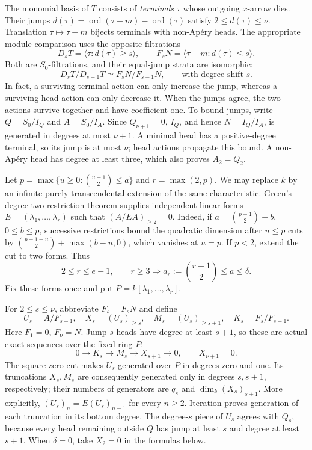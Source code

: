 The monomial basis of $T$ consists of \emph{terminals} $\tau$ whose
outgoing $x$-arrow dies.  Their jumps
$d(\tau)=\operatorname{ord}(\tau+m)-\operatorname{ord}(\tau)$ satisfy
$2\le d(\tau)\le\nu$.  Translation $\tau\mapsto\tau+m$ bijects terminals
with non-Ap\'ery heads.  The appropriate module comparison uses the
opposite filtrations
\[
 D_sT=\langle\tau:d(\tau)\ge s\rangle,\qquad
 F_sN=\langle\tau+m:d(\tau)\le s\rangle.
\]
Both are $S_0$-filtrations, and their equal-jump strata are isomorphic:
\begin{equation}\label{eq:ordinary-strata}
 D_sT/D_{s+1}T\simeq F_sN/F_{s-1}N,
 \qquad\text{with degree shift }s.
\end{equation}
In fact, a surviving terminal action can only increase the jump, whereas
a surviving head action can only decrease it.  When the jumps agree, the
two actions survive together and have coefficient one.  To bound jumps,
write $Q=S_0/I_Q$ and $A=S_0/I_A$.  Since $Q_{\nu+1}=0$, $I_Q$, and hence
$N=I_Q/I_A$, is generated in degrees at most $\nu+1$.  A minimal head has
a positive-degree terminal, so its jump is at most $\nu$; head actions
propagate this bound.  A non-Ap\'ery head has degree at least three, which
also proves $A_2=Q_2$.

Let $p=\max\{u\ge0:\binom{u+1}{2}\le a\}$ and $r=\max(2,p)$.
We may replace $k$ by an infinite purely transcendental extension of the
same characteristic.  Green's degree-two restriction theorem
\cite{GreenRestriction} supplies independent linear forms
$E=(\lambda_1,\ldots,\lambda_r)$ such that $(A/EA)_{\ge2}=0$.
Indeed, if $a=\binom{p+1}{2}+b$, $0\le b\le p$, successive restrictions
bound the quadratic dimension after $u\le p$ cuts by
$\binom{p+1-u}{2}+\max(b-u,0)$, which vanishes at $u=p$.
If $p<2$, extend the cut to two forms.  Thus
\begin{equation}\label{eq:ordinary-cut-rank}
 2\le r\le e-1,\qquad
 r\ge3\Longrightarrow a_r:=\binom{r+1}{2}\le a\le\delta.
\end{equation}
Fix these forms once and put $P=k[\lambda_1,\ldots,\lambda_r]$.

For $2\le s\le\nu$, abbreviate $F_s=F_sN$ and define
\[
 U_s=A/F_{s-1},\quad X_s=(U_s)_{\ge s},\quad
 M_s=(U_s)_{\ge s+1},\quad K_s=F_s/F_{s-1}.
\]
Here $F_1=0$, $F_\nu=N$.  Jump-$s$ heads have degree at least $s+1$,
so these are actual exact sequences over the fixed ring $P$:
\begin{equation}\label{eq:ordinary-tower}
 0\longrightarrow K_s\longrightarrow M_s\longrightarrow X_{s+1}
 \longrightarrow0,\qquad X_{\nu+1}=0.
\end{equation}
The square-zero cut makes $U_s$ generated over $P$ in degrees zero and
one.  Its truncations $X_s,M_s$ are consequently generated only in
degrees $s,s+1$, respectively; their numbers of generators are $q_s$
and $\dim_k(X_s)_{s+1}$.
More explicitly, $(U_s)_n=E(U_s)_{n-1}$ for every $n\ge2$.
Iteration proves generation of each truncation in its bottom degree.
The degree-$s$ piece of $U_s$ agrees with $Q_s$, because every head
remaining outside $Q$ has jump at least $s$ and degree at least $s+1$.
When $\delta=0$, take $X_2=0$ in the formulas below.

